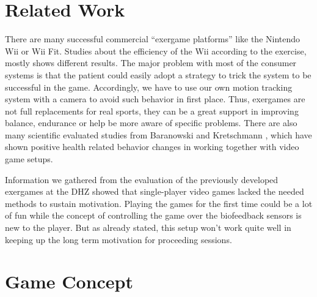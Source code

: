 \begin{multicols}{2}
\section{Related Work}
There are many successful commercial “exergame platforms” like the Nintendo Wii or Wii Fit. Studies about the efficiency of the Wii according to the exercise, mostly shows different results. \cite{Baranowski2012} The major problem with most of the consumer systems is that the patient could easily adopt a strategy to trick the system to be successful in the game. Accordingly, we have to use our own motion tracking system with a camera to avoid such behavior in first place. Thus, exergames are not full replacements for real sports, they can be a great support in improving balance, endurance or help be more aware of specific problems. There are also many scientific evaluated studies from Baranowski \cite{Baranowski2008} and Kretschmann \cite{Kretschmann2010}, which have shown positive health related behavior changes in working together with video game setups.

Information we gathered from the evaluation of the previously developed exergames at the DHZ showed that single-player video games lacked the needed methods to sustain motivation. Playing the games for the first time could be a lot of fun while the concept of controlling the game over the biofeedback sensors is new to the player. But as already stated, this setup won't work quite well in keeping up the long term motivation for proceeding sessions.

\section{Game Concept}



\end{multicols}
